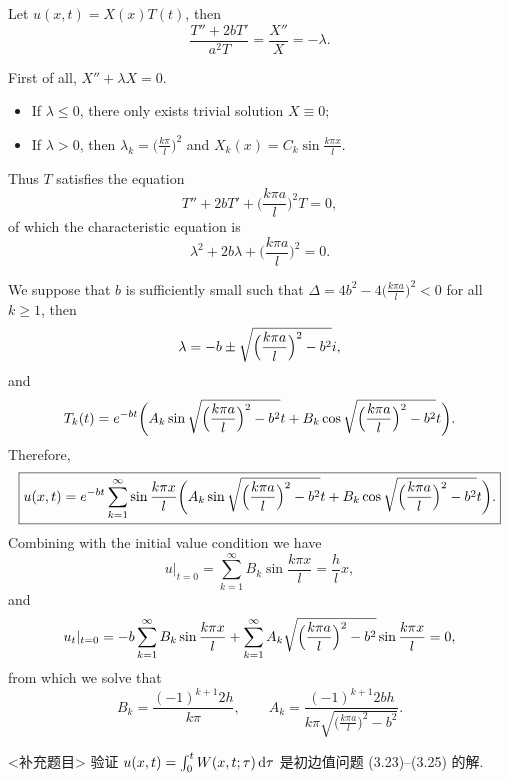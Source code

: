 \begin{solution}
  Let $u(x,t) = X(x)T(t)$, then
  \[\frac{T''+2bT'}{a^2T} = \frac{X''}{X} = -\lambda. \]

  First of all, $X'' + \lambda X = 0$.
  \begin{itemize}
    \item If $\lambda\leq 0$, there only exists trivial solution $X\equiv 0$;
    \item If $\lambda>0$, then $\lambda_k = \bigl(\frac{k\pi}{l}\bigr)^2$
      and $X_k(x) = C_k\sin\frac{k\pi x}{l}$.
  \end{itemize}

  Thus $T$ satisfies the equation
  \[ T'' + 2bT' + \biggl(\frac{k\pi a}{l}\biggr)^2 T = 0, \]
  of which the characteristic equation is
  \[ \lambda^2 + 2b\lambda + \biggl(\frac{k\pi a}{l}\biggr)^2 = 0. \]

  We suppose that $b$ is sufficiently small such that
  $\Delta = 4b^2 - 4\bigl(\frac{k\pi a}{l}\bigr)^2 < 0$ for all $k\geq 1$, then
  \[\lambda = -b \pm \sqrt{\Bigl(\frac{k\pi a}{l}\Bigr)^2 - b^2}i, \]
  and
  \[ T_k(t) = e^{-bt} \biggl(A_k \sin \sqrt{\Bigl(\frac{k\pi a}{l}\Bigr)^2 - b^2} t
    + B_k \cos \sqrt{\Bigl(\frac{k\pi a}{l}\Bigr)^2 - b^2} t\biggr). \]
  Therefore,
  \[\boxed{u(x,t) = e^{-bt} \sum_{k=1}^\infty \sin\frac{k\pi x}{l}
      \biggl(A_k \sin \sqrt{\Bigl(\frac{k\pi a}{l}\Bigr)^2 - b^2} t
      + B_k \cos \sqrt{\Bigl(\frac{k\pi a}{l}\Bigr)^2 - b^2} t\biggr).}\]
  Combining with the initial value condition we have
  \[u|_{t=0} = \sum_{k=1}^\infty B_k \sin\frac{k\pi x}{l} = \frac{h}{l}x, \]
  and
  \[u_t|_{t=0} = -b\sum_{k=1}^\infty B_k \sin\frac{k\pi x}{l}
    + \sum_{k=1}^\infty A_k \sqrt{\Bigl(\frac{k\pi a}{l}\Bigr)^2-b^2}
      \sin\frac{k\pi x}{l} = 0,\]
  from which we solve that
  \[ \boxed{B_k = \frac{(-1)^{k+1}2h}{k\pi},\qquad
    A_k = \frac{(-1)^{k+1}2bh}{k\pi\sqrt{\bigl(\frac{k\pi a}{l}\bigr)^2-b^2}}.} \]
\end{solution}


\begin{exercise}[7]<补充题目>
  验证 $u(x,t) = \int_0^t W(x,t;\tau)\mathop{}\!\mathrm{d}\tau$ 是初边值问题 (3.23)--(3.25) 的解.
\end{exercise}

